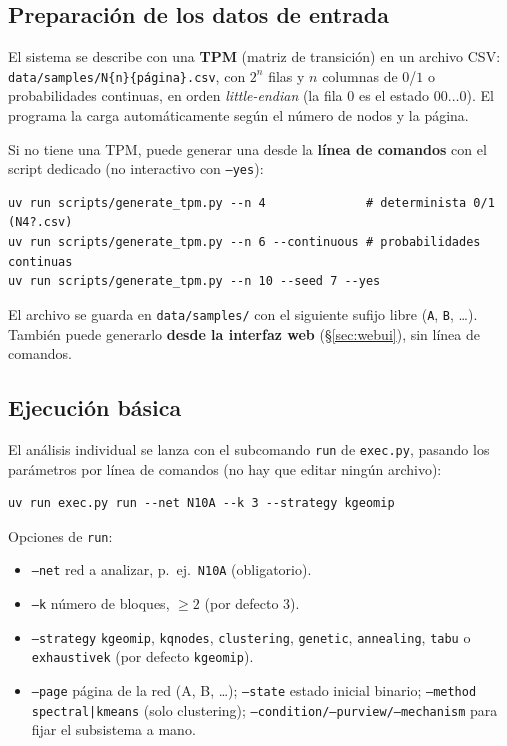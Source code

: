 \documentclass[11pt,letterpaper]{article}
\begin{document}
\subsection{Preparación de los datos de entrada}
El sistema se describe con una \textbf{TPM} (matriz de transición) en un archivo
CSV: \texttt{data/samples/N\{n\}\{página\}.csv}, con $2^n$ filas y $n$ columnas de
$0$/$1$ o probabilidades continuas, en orden \emph{little-endian} (la fila $0$
es el estado $00\dots0$). El programa la carga automáticamente según el número de nodos y la página.

\noindent Si no tiene una TPM, puede generar una desde la \textbf{línea de comandos}
con el script dedicado (no interactivo con \texttt{--yes}):
\begin{lstlisting}[style=sh]
uv run scripts/generate_tpm.py --n 4              # determinista 0/1 (N4?.csv)
uv run scripts/generate_tpm.py --n 6 --continuous # probabilidades continuas
uv run scripts/generate_tpm.py --n 10 --seed 7 --yes
\end{lstlisting}
El archivo se guarda en \texttt{data/samples/} con el siguiente sufijo libre
(\texttt{A}, \texttt{B}, \dots). También puede generarlo \textbf{desde la interfaz
	web} (§\ref{sec:webui}), sin línea de comandos.

\subsection{Ejecución básica}
El análisis individual se lanza con el subcomando \texttt{run} de \texttt{exec.py},
pasando los parámetros por línea de comandos (no hay que editar ningún archivo):

\begin{lstlisting}[style=sh]
uv run exec.py run --net N10A --k 3 --strategy kgeomip
\end{lstlisting}

\noindent Opciones de \texttt{run}:
\begin{itemize}
	\item \texttt{--net} red a analizar, p.\ ej.\ \texttt{N10A} (obligatorio).
	\item \texttt{--k} número de bloques, $\ge 2$ (por defecto 3).
	\item \texttt{--strategy} \texttt{kgeomip}, \texttt{kqnodes}, \texttt{clustering},
	      \texttt{genetic}, \texttt{annealing}, \texttt{tabu} o \texttt{exhaustivek}
	      (por defecto \texttt{kgeomip}).
	\item \texttt{--page} página de la red (A, B, \dots); \texttt{--state} estado
	      inicial binario; \texttt{--method spectral|kmeans} (solo clustering);
	      \texttt{--condition/--purview/--mechanism} para fijar el subsistema a mano.
\end{itemize}
\end{document}
